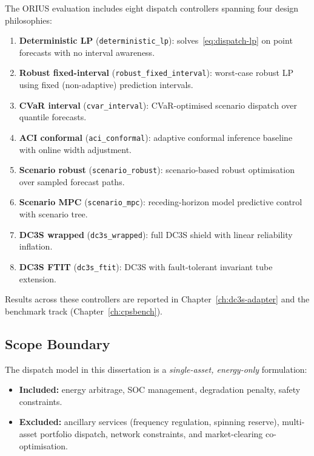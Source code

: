 The ORIUS evaluation includes eight dispatch controllers spanning four
design philosophies:

\begin{enumerate}
  \item \textbf{Deterministic LP} (\texttt{deterministic\_lp}):
    solves~\eqref{eq:dispatch-lp} on point forecasts with no interval
    awareness.
  \item \textbf{Robust fixed-interval} (\texttt{robust\_fixed\_interval}):
    worst-case robust LP using fixed (non-adaptive) prediction intervals.
  \item \textbf{CVaR interval} (\texttt{cvar\_interval}):
    CVaR-optimised scenario dispatch over quantile forecasts.
  \item \textbf{ACI conformal} (\texttt{aci\_conformal}):
    adaptive conformal inference baseline with online width adjustment.
  \item \textbf{Scenario robust} (\texttt{scenario\_robust}):
    scenario-based robust optimisation over sampled forecast paths.
  \item \textbf{Scenario MPC} (\texttt{scenario\_mpc}):
    receding-horizon model predictive control with scenario tree.
  \item \textbf{DC3S wrapped} (\texttt{dc3s\_wrapped}):
    full DC3S shield with linear reliability inflation.
  \item \textbf{DC3S FTIT} (\texttt{dc3s\_ftit}):
    DC3S with fault-tolerant invariant tube extension.
\end{enumerate}

Results across these controllers are reported in
Chapter~\ref{ch:dc3s-adapter} and the benchmark track
(Chapter~\ref{ch:cpsbench}).

\subsection{Scope Boundary}

The dispatch model in this dissertation is a \emph{single-asset, energy-only}
formulation:

\begin{itemize}
  \item \textbf{Included:} energy arbitrage, SOC management, degradation
    penalty, safety constraints.
  \item \textbf{Excluded:} ancillary services (frequency regulation, spinning
    reserve), multi-asset portfolio dispatch, network constraints, and
    market-clearing co-optimisation.
\end{itemize}


